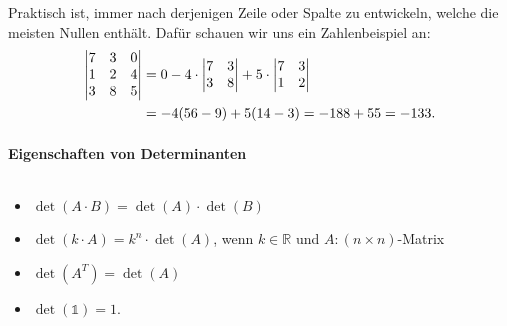 Praktisch ist, immer nach derjenigen Zeile oder Spalte zu entwickeln, welche die meisten Nullen enthält. Dafür schauen wir uns ein Zahlenbeispiel an: 
\begin{align}
    \mqty|7&3&0\\1&2&4\\3&8&5| &= 0 - 4\cdot \mqty|7 & 3\\3&8| + 5\cdot\mqty|7&3\\1&2| \notag \\
    &= -4(56-9) + 5(14-3) = -188+55 = -133.
\end{align}

\paragraph{Eigenschaften von Determinanten}$~$

\begin{itemize}
    \item $\det(A\cdot B) = \det(A)\cdot \det(B)$
    \item $\det(k\cdot A) = k^n \cdot \det(A)$, wenn $k\in \mathbb{R}$ und $A: (n\times n)$-Matrix 
    \item $\det(A^T) = \det(A)$
    \item $\det(\mathds{1}) = 1.$
\end{itemize}

